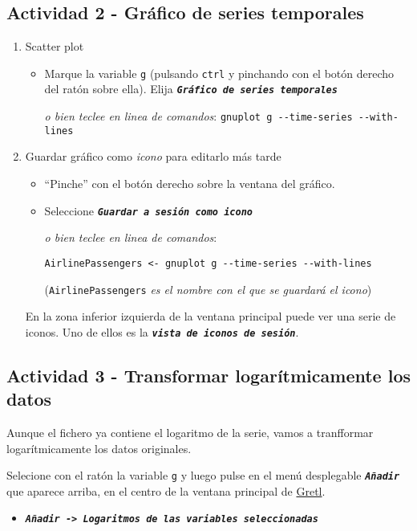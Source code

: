 \documentclass[11pt]{article}
\begin{document}
\subsection{Actividad 2 - Gráfico de series temporales}
\label{sec:org4e98db4}
\begin{enumerate}
\item Scatter plot
\label{sec:orgba273bb}
\begin{itemize}
\item Marque la variable \texttt{g} (pulsando \texttt{ctrl} y pinchando con el botón
derecho del ratón sobre ella). Elija \textbf{\emph{\texttt{Gráfico de series temporales}}}

{\vspace{1pt} \footnotesize \color{gray!70!black}
\emph{o bien teclee en linea de comandos}: \texttt{gnuplot g -{}-time-series -{}-with-lines}
}
\end{itemize}

\item Guardar gráfico como \emph{icono} para editarlo más tarde
\label{sec:org4b0a16a}
\begin{itemize}
\item ``Pinche'' con el botón derecho sobre la ventana del gráfico.
\item Seleccione \textbf{\emph{\texttt{Guardar a sesión como icono}}}

{\vspace{1pt} \footnotesize \color{gray!70!black} \color{gray!70!black}
\emph{o bien teclee en linea de comandos}:
\begin{verbatim}
AirlinePassengers <- gnuplot g --time-series --with-lines
\end{verbatim}
(\texttt{AirlinePassengers} \emph{es el nombre con el que se guardará el icono})
}
\end{itemize}

En la zona inferior izquierda de la ventana principal puede ver una
serie de iconos. Uno de ellos es la \textbf{\emph{\texttt{vista de iconos de sesión}}}.
\end{enumerate}


\subsection{Actividad 3 - Transformar logarítmicamente los datos}
\label{sec:org19d1736}
Aunque el fichero ya contiene el logaritmo de la serie, vamos a
tranfformar logarítmicamente los datos originales.

Selecione con el ratón la variable \texttt{g} y luego pulse en el menú desplegable \textbf{\emph{\texttt{Añadir}}} que aparece arriba, en el centro de la
ventana principal de \href{https://gretl.sourceforge.net/es.html}{Gretl}.
\begin{itemize}
\item \textbf{\emph{\texttt{Añadir -> Logaritmos de las variables seleccionadas}}}
\end{itemize}
\end{document}

